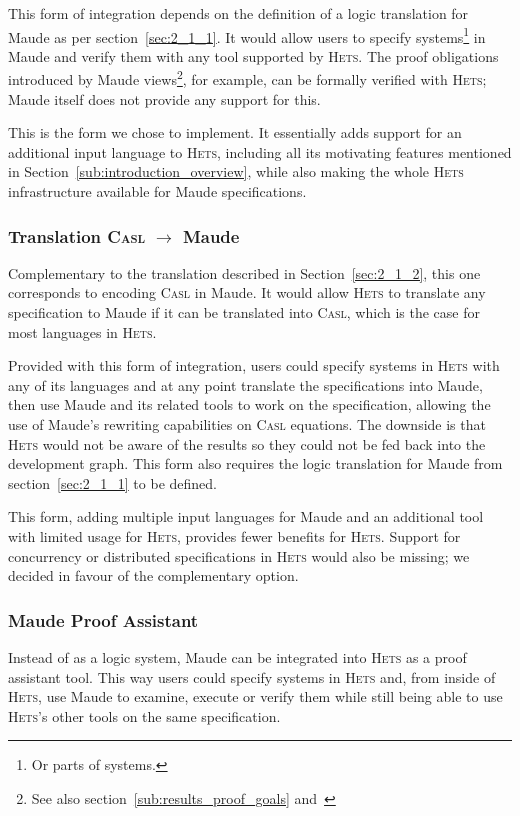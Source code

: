 \documentclass[11pt]{article}
\newcommand{\Casl}{\textsc{Casl}}
\newcommand{\Hets}{\textsc{Hets}}
\begin{document}
This form of integration depends on the definition of a logic translation for Maude as per section~\ref{sec:2_1_1}. It would allow users to specify systems\footnote{Or parts of systems.} in Maude and verify them with any tool supported by \Hets{}. The proof obligations introduced by Maude views\footnote{See also section~\ref{sub:results_proof_goals} and~\cite[ch. 6]{Clavel:2007}}, for example, can be formally verified with \Hets{}; Maude itself does not provide any support for this.

This is the form we chose to implement. It essentially adds support for an additional input language to \Hets{}, including all its motivating features mentioned in Section~\ref{sub:introduction_overview}, while also making the whole \Hets{} infrastructure available for Maude specifications.


\subsubsection{Translation \Casl{} $\rightarrow$ Maude}
\label{sec:2_1_3}

Complementary to the translation described in Section~\ref{sec:2_1_2}, this one corresponds to encoding \Casl{} in Maude. It would allow \Hets{} to translate any specification to Maude if it can be translated into \Casl{}, which is the case for most languages in \Hets{}.

Provided with this form of integration, users could specify systems in \Hets{} with any of its languages and at any point translate the specifications into Maude, then use Maude and its related tools to work on the specification, allowing the use of Maude's rewriting capabilities on \Casl{} equations. The downside is that \Hets{} would not be aware of the results so they could not be fed back into the development graph. This form also requires the logic translation for Maude from section~\ref{sec:2_1_1} to be defined.

This form, adding multiple input languages for Maude and an additional tool with limited usage for \Hets{}, provides fewer benefits for \Hets{}. Support for concurrency or distributed specifications in \Hets{} would also be missing; we decided in favour of the complementary option.


\subsubsection{Maude Proof Assistant}
\label{sec:2_1_4}

Instead of as a logic system, Maude can be integrated into \Hets{} as a proof assistant tool. This way users could specify systems in \Hets{} and, from inside of \Hets{}, use Maude to examine, execute or verify them while still being able to use \Hets{}'s other tools on the same specification.
\end{document}
